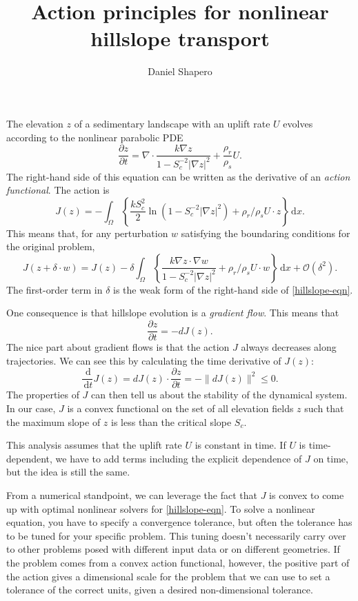 \documentclass{article}
\title{Action principles for nonlinear hillslope transport}
\author{Daniel Shapero}
\date{}
\theoremstyle{definition}
\theoremstyle{plain}
\newcommand{\ud}{\hspace{2pt}\mathrm{d}}
\begin{document}
\maketitle

The elevation $z$ of a sedimentary landscape with an uplift rate $U$ evolves according to the nonlinear parabolic PDE
\begin{equation}
    \frac{\partial z}{\partial t} = \nabla\cdot\frac{k\nabla z}{1 - S_c^{-2}|\nabla z|^2} + \frac{\rho_r}{\rho_s}U.
\label{hillslope-eqn}\end{equation}
The right-hand side of this equation can be written as the derivative of an \emph{action functional}.
The action is
\begin{equation}
    J(z) = -\int_\Omega\left\{\frac{k S_c^2}{2}\ln\left(1 - S_c^{-2}|\nabla z|^2\right) + \rho_r/\rho_s U\cdot z\right\}\ud x.
\end{equation}
This means that, for any perturbation $w$ satisfying the boundaring conditions for the original problem,
\begin{equation}
    J(z + \delta\cdot w) = J(z) - \delta\int_\Omega\left\{\frac{k\nabla z\cdot \nabla w}{1 - S_c^{-2}|\nabla z|^2} + \rho_r/\rho_s U\cdot w\right\}\ud x + \mathcal{O}(\delta^2).
\end{equation}
The first-order term in $\delta$ is the weak form of the right-hand side of \eqref{hillslope-eqn}.

One consequence is that hillslope evolution is a \emph{gradient flow}.
This means that
\begin{equation}
    \frac{\partial z}{\partial t} = -dJ(z).
\end{equation}
The nice part about gradient flows is that the action $J$ always decreases along trajectories.
We can see this by calculating the time derivative of $J(z)$:
\begin{equation}
    \frac{\ud}{\ud t}J(z) = dJ(z)\cdot\frac{\partial z}{\partial t} = -\|dJ(z)\|^2 \le 0.
\end{equation}
The properties of $J$ can then tell us about the stability of the dynamical system.
In our case, $J$ is a convex functional on the set of all elevation fields $z$ such that the maximum slope of $z$ is less than the critical slope $S_c$.

This analysis assumes that the uplift rate $U$ is constant in time.
If $U$ is time-dependent, we have to add terms including the explicit dependence of $J$ on time, but the idea is still the same.

From a numerical standpoint, we can leverage the fact that $J$ is convex to come up with optimal nonlinear solvers for \eqref{hillslope-eqn}.
To solve a nonlinear equation, you have to specify a convergence tolerance, but often the tolerance has to be tuned for your specific problem.
This tuning doesn't necessarily carry over to other problems posed with different input data or on different geometries.
If the problem comes from a convex action functional, however, the positive part of the action gives a dimensional scale for the problem that we can use to set a tolerance of the correct units, given a desired non-dimensional tolerance.
\end{document}
